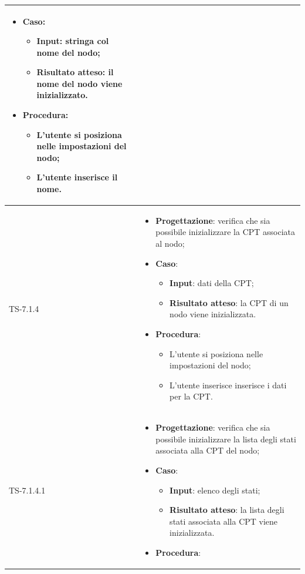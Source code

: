 \begin{longtable}{|C{2.5cm}|C{13cm}|}
\begin{itemize}
	\item \textbf{Caso}: 
	\begin{itemize}
		\item \textbf{Input}: stringa col nome del nodo;
		\item \textbf{Risultato atteso}: il nome del nodo viene inizializzato.
	\end{itemize}
	\item \textbf{Procedura}:
	\begin{itemize}
		\item L'utente si posiziona nelle impostazioni del nodo;
		\item L'utente inserisce il nome.
	\end{itemize} 
\end{itemize}
	  \\
	\hline
	{TS-7.1.4} &
\begin{itemize}
	\item \textbf{Progettazione}: verifica che sia possibile inizializzare la CPT associata al nodo;
	\item \textbf{Caso}: 
	\begin{itemize}
		\item \textbf{Input}: dati della CPT;
		\item \textbf{Risultato atteso}: la CPT di un nodo viene inizializzata.
	\end{itemize}
	\item \textbf{Procedura}:
	\begin{itemize}
		\item L'utente si posiziona nelle impostazioni del nodo;
		\item L'utente inserisce inserisce i dati per la CPT.
	\end{itemize} 
\end{itemize}
	  \\
	\hline
	{TS-7.1.4.1} &
\begin{itemize}
	\item \textbf{Progettazione}: verifica che sia possibile inizializzare la lista degli stati associata alla CPT del nodo;
	\item \textbf{Caso}: 
	\begin{itemize}
		\item \textbf{Input}: elenco degli stati;
		\item \textbf{Risultato atteso}: la lista degli stati associata alla CPT viene inizializzata.
	\end{itemize}
	\item \textbf{Procedura}:
	\begin{itemize}

\end{itemize}
\end{itemize}
\end{longtable}
